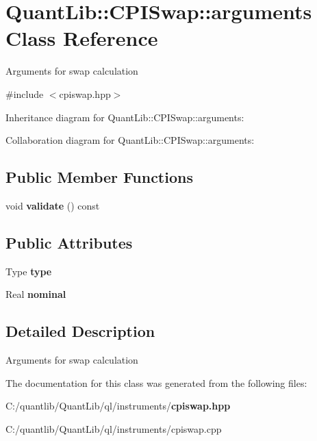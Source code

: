 \section{Quant\+Lib\+:\+:C\+P\+I\+Swap\+:\+:arguments Class Reference}
\label{class_quant_lib_1_1_c_p_i_swap_1_1arguments}


Arguments for swap calculation  




{\ttfamily \#include $<$cpiswap.\+hpp$>$}



Inheritance diagram for Quant\+Lib\+:\+:C\+P\+I\+Swap\+:\+:arguments\+:


Collaboration diagram for Quant\+Lib\+:\+:C\+P\+I\+Swap\+:\+:arguments\+:
\subsection*{Public Member Functions}
\begin{DoxyCompactItemize}
\item 
void {\bfseries validate} () const \label{class_quant_lib_1_1_c_p_i_swap_1_1arguments_a91c9974ecf18740f03cb4205c9500a0c}

\end{DoxyCompactItemize}
\subsection*{Public Attributes}
\begin{DoxyCompactItemize}
\item 
Type {\bfseries type}\label{class_quant_lib_1_1_c_p_i_swap_1_1arguments_ae28c17bd1020a740bca1979f2aa09a30}

\item 
Real {\bfseries nominal}\label{class_quant_lib_1_1_c_p_i_swap_1_1arguments_abe521b91e13c77daf799b1e32cb66b1c}

\end{DoxyCompactItemize}


\subsection{Detailed Description}
Arguments for swap calculation 

The documentation for this class was generated from the following files\+:\begin{DoxyCompactItemize}
\item 
C\+:/quantlib/\+Quant\+Lib/ql/instruments/{\bf cpiswap.\+hpp}\item 
C\+:/quantlib/\+Quant\+Lib/ql/instruments/cpiswap.\+cpp\end{DoxyCompactItemize}
